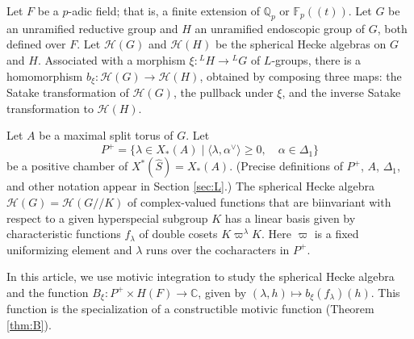 % 


\newcommand{\ring}[1]{\mathbb{#1}}
\newcommand{\ang}[1]{\langle{#1}\rangle}
\def\op#1{{\operatorname{#1}}}

\def\Q{{\ring{Q}}}

\def\C{\mathcal C}
\def\N{\mathcal N}
\def\H{\mathcal H}
\def\T{\mathcal T}
\def\D{\mathcal D}

\def\n{{\mathfrak n}}
\def\g{{\mathfrak g}}
\def\t{{\mathfrak t}}
\def\h{{\mathfrak h}}

\def\inv{\op{inv}}
\def\dom{P^+}
\newcommand{\card}{\op{card}}
\def\Frob{\op{Frob}}
\def\dotw{\dot w}
\def\uu{\upsilon} %

\def\libel#1{{\text{\sc [#1]~}}\label{#1}}
\def\rif#1{(\ref{#1}-{\text{\sc #1})}}


Let $F$ be a $p$-adic field; that is, a finite extension of
$\ring{Q}_p$ or $\ring{F}_p((t))$.  Let $G$ be an unramified reductive
group and $H$ an unramified endoscopic group of $G$, both defined over
$F$.  Let $\H(G)$ and $\H(H)$ be the spherical Hecke algebras on $G$
and $H$.  Associated with a morphism $\xi:{}^LH\to {}^LG$ of
$L$-groups, there is a homomorphism $b_\xi:\H(G)\to \H(H)$, obtained
by composing three maps: the Satake transformation of $\H(G)$, the
pullback under $\xi$, and the inverse Satake transformation to
$\H(H)$.

Let $A$ be a maximal split torus of $G$.  Let 
\[
\dom = \{\lambda\in X_*(A) \mid \ang{\lambda,\alpha^\vee}\ge 0,
\quad \alpha\in \Delta_1\}
\]
be a positive chamber of $X^*(\hat S) = X_*(A)$.  (Precise definitions
of $P^+$, $A$, $\Delta_1$, and other notation appear in
Section \ref{sec:L}.)  The spherical Hecke algebra $\H(G)=\H(G//K)$ of
complex-valued functions that are biinvariant with respect to a given
hyperspecial subgroup $K$ has a linear basis given by characteristic
functions $f_\lambda$ of double cosets $K\varpi^\lambda K$.  Here
$\varpi$ is a fixed uniformizing element and $\lambda$ runs over the
cocharacters in $P^+$.

In this article, we use motivic integration to study the spherical
Hecke algebra and the function $B_\xi:P^+\times H(F)\to \ring{C}$,
given by $(\lambda,h)\mapsto b_\xi(f_\lambda)(h)$.  This function is
the specialization of a constructible motivic function (Theorem
\ref{thm:B}).

